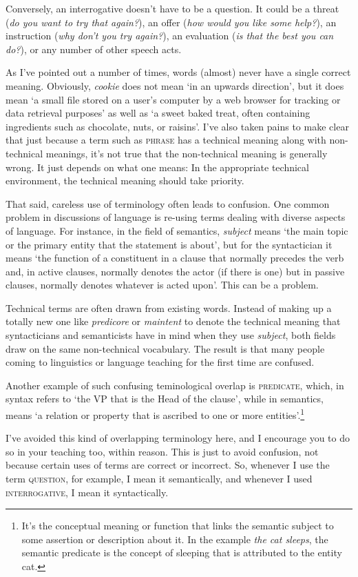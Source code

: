 Conversely, an interrogative doesn't have to be a question. It could be a threat (\textit{do you want to try that again?}), an offer (\textit{how would you like some help?}), an instruction (\textit{why don't you try again?}), an evaluation (\textit{is that the best you can do?}), or any number of other speech acts.

\begin{tcolorbox}[title=Terminological hygiene, colback=white, parbox]\label{box:terminology-hygiene}
\setlength{\parindent}{1.5em}
    \noindent As I've pointed out a number of times, words (almost) never have a single correct meaning. Obviously, \textit{cookie} does not mean `in an upwards direction', but it does mean `a small file stored on a user's computer by a web browser for tracking or data retrieval purposes' as well as `a sweet baked treat, often containing ingredients such as chocolate, nuts, or raisins'. I've also taken pains to make clear that just because a term such as \textsc{phrase} has a technical meaning along with non-technical meanings, it's not true that the non-technical meaning is generally wrong. It just depends on what one means: In the appropriate technical environment, the technical meaning should take priority.
    
    That said, careless use of terminology often leads to confusion. One common problem in discussions of language is re-using terms dealing with diverse aspects of language. For instance, in the field of semantics, \textit{subject} means `the main topic or the primary entity that the statement is about', but for the syntactician it means `the function of a constituent in a clause that normally precedes the verb and, in active clauses, normally denotes the actor (if there is one) but in passive clauses, normally denotes whatever is acted upon'. This can be a problem.
    
    Technical terms are often drawn from existing words. Instead of making up a totally new one like \textit{predicore} or \textit{maintent} to denote the technical meaning that syntacticians and semanticists have in mind when they use \textit{subject}, both fields draw on the same non-technical vocabulary. The result is that many people coming to linguistics or language teaching for the first time are confused.
    
    Another example of such confusing teminological overlap is \textsc{predicate}, which, in syntax refers to `the VP that is the \textsf{Head} of the clause', while in semantics, means `a relation or property that is ascribed to one or more entities'.\footnote{It's the conceptual meaning or function that links the semantic subject to some assertion or description about it. In the example \textit{the cat sleeps}, the semantic predicate is the concept of sleeping that is attributed to the entity cat.}

    I've avoided this kind of overlapping terminology here, and I encourage you to do so in your teaching too, within reason. This is just to avoid confusion, not because certain uses of terms are correct or incorrect. So, whenever I use the term \textsc{question}, for example, I mean it semantically, and whenever I used \textsc{interrogative}, I mean it syntactically.
\end{tcolorbox}

